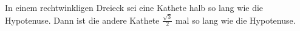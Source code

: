 
In einem rechtwinkligen Dreieck sei eine Kathete halb so lang wie die Hypotenuse. Dann ist die andere Kathete $\frac{\sqrt{3}}{2}$ mal so lang wie die Hypotenuse.
